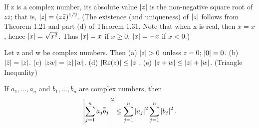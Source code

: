 \begin{definition} %
  \label{def:chap1:complex_absolute_value}
  If z is a complex number, its absolute value $\left\lvert z \right\rvert$ is the
  non-negative square root of $z\bar{z}$; that is, $\left\lvert z \right\rvert = (z\bar{z})^{1/2}$.
  (The existence (and uniqueness) of $\left\lvert z \right\rvert$ follows from Theorem
    1.21 and part (d) of Theorem 1.31. Note that when x is real, then
    $\bar{x}=x$, hence $\left\lvert x \right\rvert = \sqrt{x^2}$. Thus $\left\lvert x \right\rvert=x$ if $x
  \ge 0$, $\left\lvert x \right\rvert = -x$ if $x < 0$.)
\end{definition}

\begin{theorem} %
  \label{thm:chap1:absolute_value_properties}
  Let z and w be complex numbers. Then
  (a) $\left\lvert z \right\rvert > 0$ unless $z=0$; $\left\lvert 0 \right\rvert=0$.
  (b) $|\bar{z}| = \left\lvert z \right\rvert$.
  (c) $\left\lvert zw \right\rvert = \left\lvert z \right\rvert\left\lvert w \right\rvert$.
  (d) $\left\lvert \operatorname{Re}(z) \right\rvert \le \left\lvert z \right\rvert$.
  (e) $\left\lvert z+w \right\rvert \le \left\lvert z \right\rvert + \left\lvert w \right\rvert$. (Triangle Inequality)
\end{theorem}


\begin{theorem} %
  \label{thm:chap1:schwarz_inequality}
  If $a_1, \dots, a_n$ and $b_1, \dots, b_n$ are complex numbers, then
  \[ \left\lvert \sum_{j=1}^{n} a_j \bar{b}_j \right\rvert^2 \le \sum_{j=1}^{n}
  \left\lvert a_j \right\rvert^2 \sum_{j=1}^{n} \left\lvert b_j \right\rvert^2. \]
\end{theorem}



